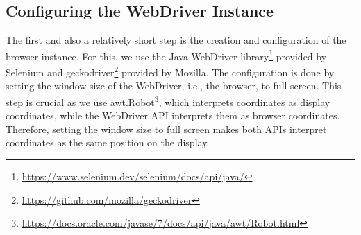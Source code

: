 \subsection{Configuring the WebDriver Instance}
The first and also a relatively short step is the creation and configuration of the browser instance. For this, we use the Java WebDriver library\footnote{\url{https://www.selenium.dev/selenium/docs/api/java/}} provided by Selenium and geckodriver\footnote{\url{https://github.com/mozilla/geckodriver}} provided by Mozilla.
The configuration is done by setting the window size of the WebDriver, i.e., the browser, to full screen. This step is crucial as we use awt.Robot\footnote{\url{https://docs.oracle.com/javase/7/docs/api/java/awt/Robot.html}}, which interprets coordinates as display coordinates, while the WebDriver API interprets them as browser coordinates. Therefore, setting the window size to full screen makes both APIs interpret coordinates as the same position on the display.  